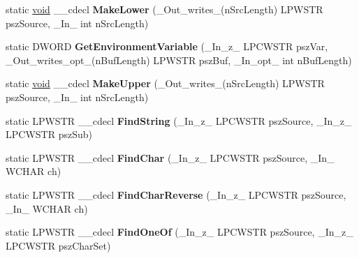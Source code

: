 \begin{DoxyCompactItemize}
\item 
\mbox{\label{class_a_t_l_1_1_ch_traits_c_r_t_abe38ec4f166a5185e7684b9a01fd3518}} 
static \hyperlink{interfacevoid}{void} \+\_\+\+\_\+cdecl {\bfseries Make\+Lower} (\+\_\+\+Out\+\_\+writes\+\_\+(n\+Src\+Length) L\+P\+W\+S\+TR psz\+Source, \+\_\+\+In\+\_\+ int n\+Src\+Length)
\item 
\mbox{\label{class_a_t_l_1_1_ch_traits_c_r_t_a0629822f5563e3b4f5d4be4dcf2f772b}} 
static D\+W\+O\+RD {\bfseries Get\+Environment\+Variable} (\+\_\+\+In\+\_\+z\+\_\+ L\+P\+C\+W\+S\+TR psz\+Var, \+\_\+\+Out\+\_\+writes\+\_\+opt\+\_\+(n\+Buf\+Length) L\+P\+W\+S\+TR psz\+Buf, \+\_\+\+In\+\_\+opt\+\_\+ int n\+Buf\+Length)
\item 
\mbox{\label{class_a_t_l_1_1_ch_traits_c_r_t_a0b9ecdac96fb4327ff039eb4b938cba7}} 
static \hyperlink{interfacevoid}{void} \+\_\+\+\_\+cdecl {\bfseries Make\+Upper} (\+\_\+\+Out\+\_\+writes\+\_\+(n\+Src\+Length) L\+P\+W\+S\+TR psz\+Source, \+\_\+\+In\+\_\+ int n\+Src\+Length)
\item 
\mbox{\label{class_a_t_l_1_1_ch_traits_c_r_t_abe09f2ee50eb80d90a709213f86f87c1}} 
static L\+P\+W\+S\+TR \+\_\+\+\_\+cdecl {\bfseries Find\+String} (\+\_\+\+In\+\_\+z\+\_\+ L\+P\+C\+W\+S\+TR psz\+Source, \+\_\+\+In\+\_\+z\+\_\+ L\+P\+C\+W\+S\+TR psz\+Sub)
\item 
\mbox{\label{class_a_t_l_1_1_ch_traits_c_r_t_ad03488c82995838b139d0cba891f9368}} 
static L\+P\+W\+S\+TR \+\_\+\+\_\+cdecl {\bfseries Find\+Char} (\+\_\+\+In\+\_\+z\+\_\+ L\+P\+C\+W\+S\+TR psz\+Source, \+\_\+\+In\+\_\+ W\+C\+H\+AR ch)
\item 
\mbox{\label{class_a_t_l_1_1_ch_traits_c_r_t_a3ca3fe91bb850cdd8a46155b1bd9dd0a}} 
static L\+P\+W\+S\+TR \+\_\+\+\_\+cdecl {\bfseries Find\+Char\+Reverse} (\+\_\+\+In\+\_\+z\+\_\+ L\+P\+C\+W\+S\+TR psz\+Source, \+\_\+\+In\+\_\+ W\+C\+H\+AR ch)
\item 
\mbox{\label{class_a_t_l_1_1_ch_traits_c_r_t_a437dc0360123aa54dd44c682af43c0c5}} 
static L\+P\+W\+S\+TR \+\_\+\+\_\+cdecl {\bfseries Find\+One\+Of} (\+\_\+\+In\+\_\+z\+\_\+ L\+P\+C\+W\+S\+TR psz\+Source, \+\_\+\+In\+\_\+z\+\_\+ L\+P\+C\+W\+S\+TR psz\+Char\+Set)

\end{DoxyCompactItemize}

